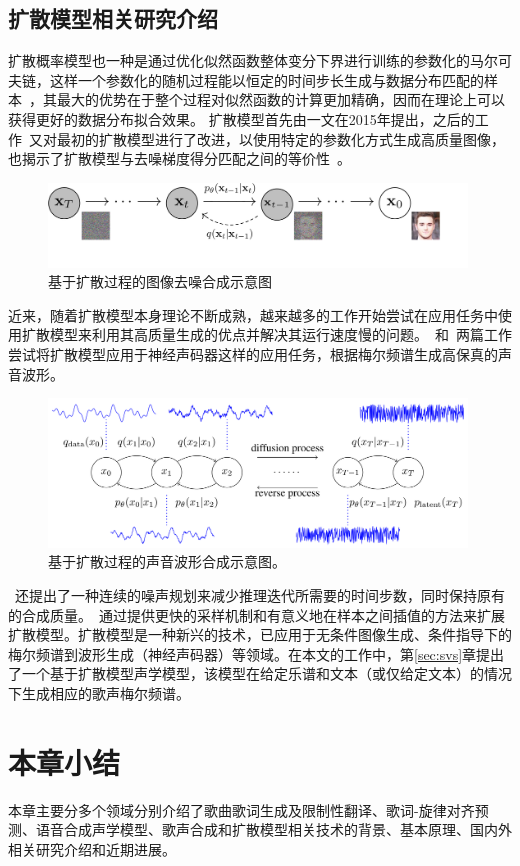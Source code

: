 \subsection{扩散模型相关研究介绍}
扩散概率模型也一种是通过优化似然函数整体变分下界进行训练的参数化的马尔可夫链，这样一个参数化的随机过程能以恒定的时间步长生成与数据分布匹配的样本~\citep{Ho2020ddpm}，其最大的优势在于整个过程对似然函数的计算更加精确，因而在理论上可以获得更好的数据分布拟合效果。
扩散模型首先由\citet{sohl2015deep}一文在2015年提出，之后的工作\citet{Ho2020ddpm}~又对最初的扩散模型进行了改进，以使用特定的参数化方式生成高质量图像，也揭示了扩散模型与去噪梯度得分匹配之间的等价性~\citep{song2019generative,song2021scorebased}。
\begin{figure}[!h]
  \includegraphics[width=0.99\textwidth]{figure/related/ddpm.pdf}
  \caption{基于扩散过程的图像去噪合成示意图}
\end{figure}
近来，随着扩散模型本身理论不断成熟，越来越多的工作开始尝试在应用任务中使用扩散模型来利用其高质量生成的优点并解决其运行速度慢的问题。\citet{kong2021diffwave}~和\citet{chen2021wavegrad}~两篇工作尝试将扩散模型应用于神经声码器这样的应用任务，根据梅尔频谱生成高保真的声音波形。
\begin{figure}[!h]
  \includegraphics[width=0.99\textwidth]{figure/related/diffwave.png}
  \caption{基于扩散过程的声音波形合成示意图\citep{kong2021diffwave}。}
\end{figure}
\citet{chen2021wavegrad}~还提出了一种连续的噪声规划来减少推理迭代所需要的时间步数，同时保持原有的合成质量。\citet{song2021denoising}~通过提供更快的采样机制和有意义地在样本之间插值的方法来扩展扩散模型。扩散模型是一种新兴的技术，已应用于无条件图像生成、条件指导下的梅尔频谱到波形生成（神经声码器）等领域。在本文的工作中，第\ref{sec:svs}章提出了一个基于扩散模型声学模型，该模型在给定乐谱和文本（或仅给定文本）的情况下生成相应的歌声梅尔频谱。
\section{本章小结}
本章主要分多个领域分别介绍了歌曲歌词生成及限制性翻译、歌词-旋律对齐预测、语音合成声学模型、歌声合成和扩散模型相关技术的背景、基本原理、国内外相关研究介绍和近期进展。
